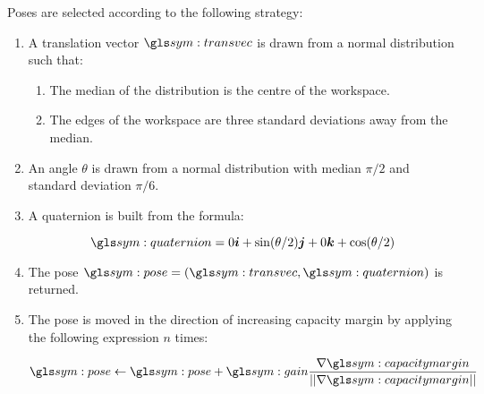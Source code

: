 		Poses are selected according to the following strategy:

		\begin{enumerate}

			\item

				A translation vector $\transvec$ is drawn from a normal
				distribution such that:
				\label{item:sample_strategy:translation}

				\begin{enumerate}

					\item

						The median of the distribution is the centre of the
						workspace.

					\item

						The edges of the workspace are three standard deviations
						away from the median.
				\end{enumerate}

			\item

				An angle $\theta$ is drawn from a normal distribution with
				median $\pi/2$ and standard deviation $\pi/6$.

				\label{item:sample_strategy:angle}

			\item

				A quaternion is built from the formula:

				\begin{equation}
					\quaternion = 0\vec{i} + \sin(\theta/2)\vec{j} + 0\vec{k} +
						\cos(\theta/2)
				\end{equation}

				\label{item:sample_strategy:quaternion}


			\item

				The pose $\pose = (\transvec, \quaternion)$ is returned.

			\item

				The pose is moved in the direction of increasing capacity margin
				by applying the following expression $n$ times:

				\label{item:improve_capacity_margin}

				\begin{equation}
					\pose \gets \pose +
						\gain\frac
						{%
							\nabla\capacitymargin
						}
						{%
							\norm
							{%
								\nabla\capacitymargin
							}
						}
					\label{eq:improve_sampled_capacity_margin}
				\end{equation}


		\end{enumerate}

